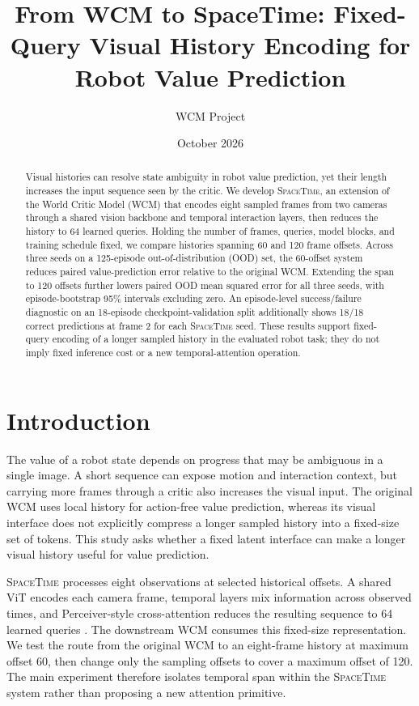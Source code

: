 \documentclass[10pt,a4paper]{article}
\title{From WCM to SpaceTime: Fixed-Query Visual History Encoding for Robot Value Prediction}
\author{WCM Project}
\date{October 2026}
\newcommand{\SpaceTime}{\textsc{SpaceTime}}
\newcommand{\WCM}{\textsc{WCM}}
\begin{document}
\maketitle

\begin{abstract}
Visual histories can resolve state ambiguity in robot value prediction, yet their length increases the input sequence seen by the critic. We develop \SpaceTime{}, an extension of the World Critic Model (WCM) that encodes eight sampled frames from two cameras through a shared vision backbone and temporal interaction layers, then reduces the history to 64 learned queries. Holding the number of frames, queries, model blocks, and training schedule fixed, we compare histories spanning 60 and 120 frame offsets. Across three seeds on a 125-episode out-of-distribution (OOD) set, the 60-offset system reduces paired value-prediction error relative to the original WCM. Extending the span to 120 offsets further lowers paired OOD mean squared error for all three seeds, with episode-bootstrap 95\% intervals excluding zero. An episode-level success/failure diagnostic on an 18-episode checkpoint-validation split additionally shows 18/18 correct predictions at frame 2 for each \SpaceTime{} seed. These results support fixed-query encoding of a longer sampled history in the evaluated robot task; they do not imply fixed inference cost or a new temporal-attention operation.
\end{abstract}

\section{Introduction}

The value of a robot state depends on progress that may be ambiguous in a single image. A short sequence can expose motion and interaction context, but carrying more frames through a critic also increases the visual input. The original \WCM{} uses local history for action-free value prediction, whereas its visual interface does not explicitly compress a longer sampled history into a fixed-size set of tokens. This study asks whether a fixed latent interface can make a longer visual history useful for value prediction.

\SpaceTime{} processes eight observations at selected historical offsets. A shared ViT encodes each camera frame, temporal layers mix information across observed times, and Perceiver-style cross-attention reduces the resulting sequence to 64 learned queries \citep{dosovitskiy2021vit,jaegle2021perceiver}. The downstream WCM consumes this fixed-size representation. We test the route from the original WCM to an eight-frame history at maximum offset 60, then change only the sampling offsets to cover a maximum offset of 120. The main experiment therefore isolates temporal span within the \SpaceTime{} system rather than proposing a new attention primitive.
\end{document}
